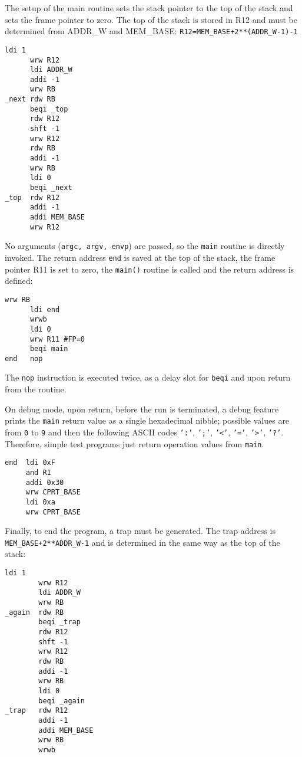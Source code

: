 The setup of the main routine sets the stack pointer to
the top of the stack and sets the frame pointer to zero.
The top of the stack is stored in {\sc R12} and must be
determined from {\sc ADDR\_W} and {\sc MEM\_BASE}:
{\tt R12=MEM\_BASE+2**(ADDR\_W-1)-1}
\begin{Verbatim}[baselinestretch=1.2]
      ldi 1
      wrw R12
      ldi ADDR_W
      addi -1
      wrw RB
_next rdw RB
      beqi _top
      rdw R12
      shft -1
      wrw R12
      rdw RB
      addi -1
      wrw RB
      ldi 0
      beqi _next
_top  rdw R12
      addi -1
      addi MEM_BASE
      wrw R12
\end{Verbatim}

No arguments ({\tt argc, argv, envp}) are passed, so the
{\tt main} routine is directly invoked.
The return address {\tt end} is saved at the top of the
stack, the frame pointer {\sc R11} is set to zero, the
{\tt main()} routine is called and the return address is
defined:
\begin{Verbatim}[baselinestretch=1.2]
      wrw RB
      ldi end
      wrwb
      ldi 0
      wrw R11 #FP=0
      beqi main
end   nop
\end{Verbatim}
The {\tt nop} instruction is executed twice, as a delay
slot for {\tt beqi} and upon return from the routine.

On debug mode, upon return, before the run is terminated,
a debug feature prints the {\tt main} return value as a
single hexadecimal nibble; possible values are from {\tt 0}
to {\tt 9} and then the following {\sc ASCII} codes {\tt ':'},
{\tt ';'}, {\tt '<'}, {\tt '='}, {\tt '>'}, {\tt '?'}.
Therefore, simple test programs just return operation values
from {\tt main}.
\begin{Verbatim}[baselinestretch=1.2]
end  ldi 0xF
     and R1
     addi 0x30
     wrw CPRT_BASE
     ldi 0xa
     wrw CPRT_BASE
\end{Verbatim}

Finally, to end the program, a trap must be generated.
The trap address is {\tt MEM\_BASE+2**ADDR\_W-1} and is
determined in the same way as the top of the stack:
\begin{Verbatim}[baselinestretch=1.2]
        ldi 1
        wrw R12
        ldi ADDR_W
        wrw RB
_again  rdw RB
        beqi _trap
        rdw R12
        shft -1
        wrw R12
        rdw RB
        addi -1
        wrw RB
        ldi 0
        beqi _again
_trap   rdw R12
        addi -1
        addi MEM_BASE
        wrw RB
        wrwb
\end{Verbatim}

